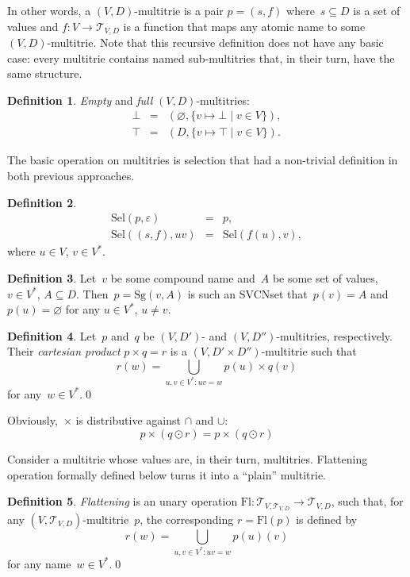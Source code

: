 \documentclass{article}
\theoremstyle{definition}
\newtheorem{Df}{Definition}
\newcommand{\setcharmt}{T}
\newcommand{\setsymbol}[3]{\mathcal{#1}_{#2,#3}}
\newcommand{\setmt}[2]{\setsymbol{\setcharmt}{#1}{#2}}
\newcommand{\flatten}{\mathrm{Fl}}
\newcommand{\select}{\mathrm{Sel}}
\newcommand{\singleleaf}{\mathrm{Sg}}
\begin{document}
In other words, a $(V,D)$-multitrie is a pair $p = (s, f)$ where~$s\subseteq D$
is a set of values and $f: V \to \setmt{V}{D}$ is a function that maps any
atomic name to some $(V,D)$-multitrie. Note that this recursive definition does
not have any basic case: every multitrie contains named sub-multitries that, in
their turn, have the same structure.

\begin{Df}\label{df:mt-extreme}
\emph{Empty} and \emph{full} $(V,D)$-multitries:
\begin{eqnarray*}
  \bot & = & ( \varnothing, \{ v \mapsto \bot \mid v\in V \} ) , \\
  \top & = & ( D,           \{ v \mapsto \top \mid v\in V \} ) .
\end{eqnarray*}
\end{Df}

The basic operation on multitries is selection that had a non-trivial
definition in both previous approaches.

\begin{Df}\label{df:mt-select}
\begin{eqnarray*}
  \select(p, \varepsilon) & = & p , \\
  \select((s, f), u v) & = & \select(f(u), v) ,
\end{eqnarray*}
where $u\in V$, $v\in V^\ast$.
\end{Df}


\begin{Df}
Let~$v$ be some compound name and~$A$ be some set of values, $v\in V^\ast$,
$A\subseteq D$.  Then~$p = \singleleaf(v,A)$ is such an SVCNset that~$p(v) =
A$ and~$p(u) = \varnothing$ for any $u\in V^\ast$, $u\neq v$.
\end{Df}

\begin{Df}\label{df:cartesian}
Let~$p$ and~$q$ be $(V,D')$- and $(V,D'')$-multitries, respectively. Their
\emph{cartesian product} $p\times q = r$ is a $(V,D'\times D'')$-multitrie
such that
\[
  r(w) = \bigcup_{u,v\in V^\ast: uv = w} p(u) \times q(v)
\]
for any~$w\in V^\ast$.\qed
\end{Df}

Obviously,~$\times$ is distributive against $\cap$ and $\cup$:
\[
  p\times(q\odot r) = p\times(q\odot r)
\]

Consider a multitrie whose values are, in their turn, multitries.
Flattening operation formally defined below turns it into a ``plain'' multitrie.
\begin{Df}\label{df:flatten}
\emph{Flattening} is an unary operation $\flatten : \setmt{V}{\setmt{V}{D}}
\to\setmt{V}{D}$, such that, for any $(V,\setmt{V}{D})$-multitrie~$p$, the
corresponding $r=\flatten(p)$ is defined by
\[
  r(w) = \bigcup_{u,v\in V^\ast: uv = w} p(u)(v)
\]
for any name~$w\in V^\ast$.\qed
\end{Df}
\end{document}
